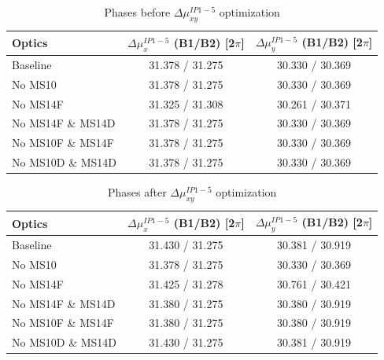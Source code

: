 \documentclass{cernatsnote}
\begin{document}
\begin{table}[h!]
\begin{center}
\caption{\label{phases_tab_all_before} Phases before $\Delta\mu_{xy}^{IP1-5}$ optimization}
\begin{tabular}{lcc} \hline
Optics &  $\Delta\mu_{x}^{IP1-5}$ (B1/B2) [2$\pi$] &  $\Delta\mu_{y}^{IP1-5}$ (B1/B2) [2$\pi$]   \\ \hline
Baseline  &   31.378   / 31.275  &  30.330 / 30.369     \\
No MS10  &  31.378   / 31.275  &  30.330 / 30.369   \\
No MS14F  &   31.325   / 31.308      &     30.261 / 30.371     \\
No MS14F \& MS14D  &  31.378   / 31.275  &  30.330 / 30.369   \\
No MS10F \& MS14F  &  31.378   / 31.275  &  30.330 / 30.369   \\
No MS10D \& MS14D  & 31.378   / 31.275  &  30.330 / 30.369   \\ \hline

\end{tabular}
\end{center}
\end{table}

\begin{table}[h!]
\begin{center}
\caption{\label{phases_tab_all_after} Phases after $\Delta\mu_{xy}^{IP1-5}$ optimization}
\begin{tabular}{lcc} \hline
Optics &  $\Delta\mu_{x}^{IP1-5}$ (B1/B2) [2$\pi$] &  $\Delta\mu_{y}^{IP1-5}$ (B1/B2) [2$\pi$]   \\ \hline
Baseline  &   31.430   / 31.275      &      30.381 / 30.919     \\
No MS10  &  31.378   / 31.275  &  30.330 / 30.369    \\
No MS14F  &     31.425 / 31.278      &      30.761 / 30.421      \\
No MS14F \& MS14D  &   31.380 / 31.275       &   30.380 / 30.919     \\
No MS10F \& MS14F  &   31.380 / 31.275       &   30.380 / 30.919     \\
No MS10D \& MS14D  &  31.430   / 31.275      &      30.381 / 30.919   \\ \hline

\end{tabular}
\end{center}
\end{table}
\end{document}

